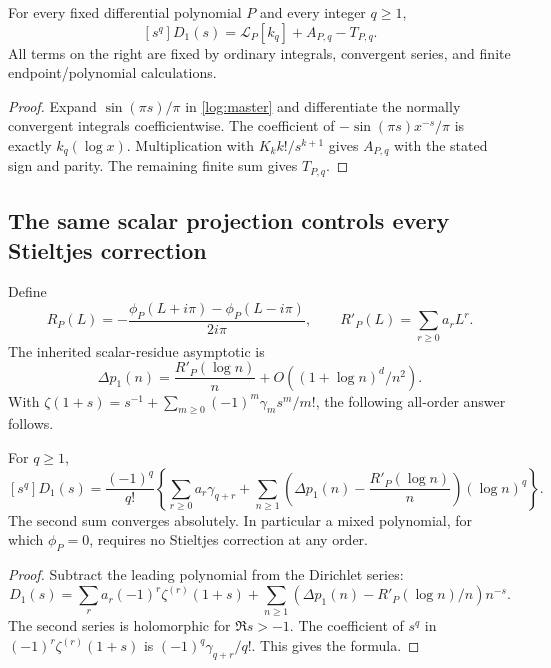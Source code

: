 \begin{corollary}
\label{log:coefficient}
For every fixed differential polynomial $P$ and every integer $q\ge1$,
\begin{equation}\label{log:coefficient-formula}
 \boxed{[s^q]D_1(s)=\mathcal L_P[k_q]+A_{P,q}-T_{P,q}.}
\end{equation}
All terms on the right are fixed by ordinary integrals, convergent
series, and finite endpoint/polynomial calculations.
\end{corollary}
\begin{proof}
Expand $\sin(\pi s)/\pi$ in \eqref{log:master} and differentiate
the normally convergent integrals coefficientwise. The coefficient
of $-\sin(\pi s)x^{-s}/\pi$ is exactly $k_q(\log x)$.
Multiplication with $K_k k!/s^{k+1}$ gives $A_{P,q}$ with the
stated sign and parity. The remaining finite sum gives $T_{P,q}$.
\end{proof}

\subsection{The same scalar projection controls every Stieltjes correction}

Define
\[
 R_P(L)=-\frac{\phi_P(L+i\pi)-\phi_P(L-i\pi)}{2i\pi},
 \qquad R'_P(L)=\sum_{r\ge0}a_rL^r.
\]
The inherited scalar-residue asymptotic \cite[Section 2]{DPL} is
\[
 \Delta p_1(n)=\frac{R'_P(\log n)}n
                 +O((1+\log n)^d/n^2).
\]
With $\zeta(1+s)=s^{-1}+\sum_{m\ge0}(-1)^m\gamma_m s^m/m!$,
the following all-order answer follows.

\begin{corollary}
\label{log:Stieltjes}
For $q\ge1$,
\begin{equation}\label{log:stieltjes-formula}
 \boxed{\displaystyle
 [s^q]D_1(s)=\frac{(-1)^q}{q!}
 \left\{\sum_{r\ge0}a_r\gamma_{q+r}
 +\sum_{n\ge1}\left(\Delta p_1(n)-\frac{R'_P(\log n)}n\right)
                      (\log n)^q\right\}.}
\end{equation}
The second sum converges absolutely. In particular a mixed polynomial,
for which $\phi_P=0$, requires no Stieltjes correction at any order.
\end{corollary}
\begin{proof}
Subtract the leading polynomial from the Dirichlet series:
\[
 D_1(s)=\sum_r a_r(-1)^r\zeta^{(r)}(1+s)
  +\sum_{n\ge1}\left(\Delta p_1(n)-R'_P(\log n)/n\right)n^{-s}.
\]
The second series is holomorphic for $\Re s>-1$. The coefficient
of $s^q$ in $(-1)^r\zeta^{(r)}(1+s)$ is
$(-1)^q\gamma_{q+r}/q!$. This gives the formula.
\end{proof}

